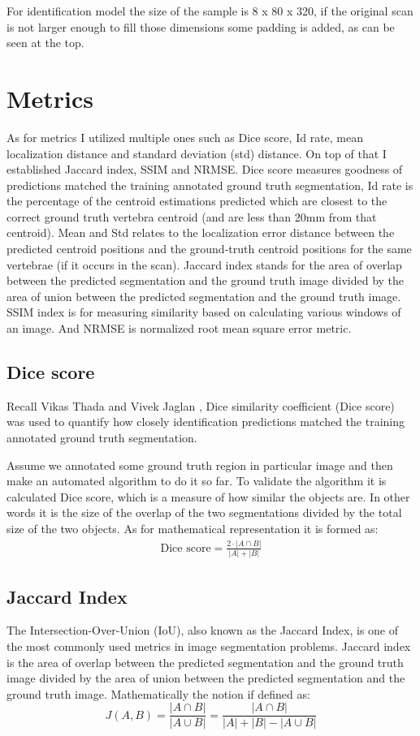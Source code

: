 For identification model the size of the sample is 8 x 80 x 320, if the original scan is not larger enough to fill those dimensions some padding is added, as can be seen at the top.

\section{Metrics}
As for metrics I utilized multiple ones such as Dice score, Id rate, mean localization distance and standard deviation (std) distance. On top of that I established Jaccard index, SSIM and NRMSE. Dice score measures goodness of predictions matched the training annotated ground truth segmentation, Id rate is the percentage of the centroid estimations predicted which are closest to the correct ground truth vertebra centroid (and are less than 20mm from that centroid). Mean and Std relates to the localization error distance between the predicted centroid positions and the ground-truth centroid positions for the same vertebrae (if it occurs in the scan). Jaccard index stands for the area of overlap between the predicted segmentation and the ground truth image divided by the area of union between the predicted segmentation and the ground truth image. SSIM index is for measuring similarity based on calculating various windows of an image. And NRMSE is normalized root mean square error metric. 

\subsection{Dice score}
Recall Vikas Thada and Vivek Jaglan \cite{Thada2013}, Dice similarity coefficient (Dice score) was used to quantify how closely identification predictions matched the training annotated ground truth segmentation. 

Assume we annotated some ground truth region in particular image and then make an automated algorithm to do it so far. To validate the algorithm it is calculated Dice score, which is a measure of how similar the objects are. In other words it is the size of the overlap of the two segmentations divided by the total size of the two objects. As for mathematical representation it is formed as:
\begin{align*}
  \text{Dice score} = \frac{2\cdot | A\cap B|}{|A| + |B|}
\end{align*}

\subsection{Jaccard Index}
The Intersection-Over-Union (IoU), also known as the Jaccard Index, is one of the most commonly used metrics in image segmentation problems. Jaccard index is the area of overlap between the predicted segmentation and the ground truth image divided by the area of union between the predicted segmentation and the ground truth image. Mathematically the notion if defined as: 
\[ J(A,B) = \frac{|A \cap B|}{|A \cup B|} = \frac{|A \cap B|}{|A| + |B| - |A \cup B|}\]

